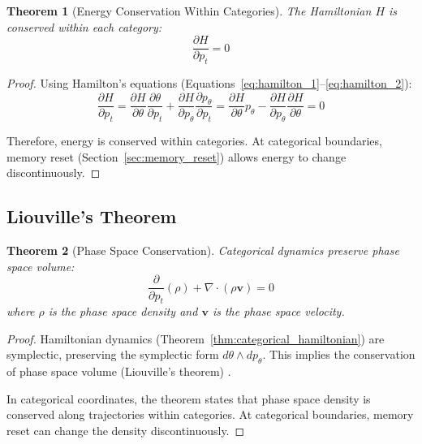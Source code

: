 \documentclass[11pt,twocolumn,a4paper]{article}
\newtheorem{theorem}{Theorem}[section]
\theoremstyle{definition}
\theoremstyle{remark}
\begin{document}
\begin{theorem}[Energy Conservation Within Categories]
\label{thm:energy_conservation}
The Hamiltonian $H$ is conserved within each category:
\begin{equation}
\frac{\partial H}{\partial p_t} = 0
\label{eq:energy_conservation}
\end{equation}
\end{theorem}

\begin{proof}
Using Hamilton's equations (Equations~\eqref{eq:hamilton_1}--\eqref{eq:hamilton_2}):
\begin{equation}
\frac{\partial H}{\partial p_t} = \frac{\partial H}{\partial \theta}\frac{\partial\theta}{\partial p_t} + \frac{\partial H}{\partial p_\theta}\frac{\partial p_\theta}{\partial p_t} = \frac{\partial H}{\partial \theta} p_\theta - \frac{\partial H}{\partial p_\theta}\frac{\partial H}{\partial \theta} = 0
\end{equation}

Therefore, energy is conserved within categories. At categorical boundaries, memory reset (Section~\ref{sec:memory_reset}) allows energy to change discontinuously.
\end{proof}

\subsection{Liouville's Theorem}

\begin{theorem}[Phase Space Conservation]
\label{thm:liouville}
Categorical dynamics preserve phase space volume:
\begin{equation}
\frac{\partial}{\partial p_t}(\rho) + \nabla \cdot (\rho \mathbf{v}) = 0
\label{eq:liouville}
\end{equation}
where $\rho$ is the phase space density and $\mathbf{v}$ is the phase space velocity.
\end{theorem}

\begin{proof}
Hamiltonian dynamics (Theorem~\ref{thm:categorical_hamiltonian}) are symplectic, preserving the symplectic form $d\theta \wedge dp_\theta$. This implies the conservation of phase space volume (Liouville's theorem) \citep{arnold1989mathematical,goldstein2002classical}.

In categorical coordinates, the theorem states that phase space density is conserved along trajectories within categories. At categorical boundaries, memory reset can change the density discontinuously.
\end{proof}
\end{document}
